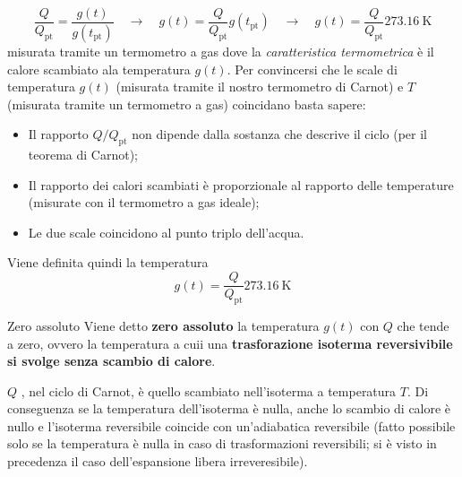 \documentclass[x11names]{report}
\begin{document}
\[ 
\frac{Q}{Q_{\text{pt}}} = \frac{g(t)}{g(t_{\text{pt}})} \quad \to \quad g(t) =\frac{Q}{Q_{\text{pt}}}  g(t_{\text{pt}}) \quad \to \quad g(t) =\frac{Q}{Q_{\text{pt}}}\SI{ 273.16}{\kelvin}
\]misurata tramite un termometro a gas
dove la \textit{caratteristica termometrica} è il calore scambiato ala temperatura \(g(t)\). Per convincersi che le scale di temperatura \(g(t)\) (misurata tramite il nostro termometro di Carnot) e \(T\) (misurata tramite un termometro a gas) coincidano basta sapere:
\begin{itemize}
	\item Il  rapporto \(Q/Q_{\text{pt}}\) non dipende dalla  sostanza che descrive il ciclo (per il teorema di Carnot);
	\item Il rapporto dei calori scambiati è proporzionale al rapporto delle temperature (misurate con il termometro a gas ideale);
	\item Le due scale coincidono al punto triplo dell'acqua.
\end{itemize}
Viene definita quindi la temperatura
\[ 
g(t) = \frac{Q}{Q_{\text{pt}}}\SI{ 273.16}{\kelvin}
\]
\begin{center}
	\colorbox{yblue}{\begin{minipage}{5.75in}
			\begin{blues}{Zero assoluto}
				Viene detto \textbf{zero assoluto} la temperatura \(g(t)\) con \(Q\) che tende a zero, ovvero la temperatura a cuii una \textbf{trasforazione isoterma reversivibile si svolge senza scambio di calore}.
			\end{blues}
	\end{minipage}}
\end{center}

\(Q\) , nel ciclo di Carnot, è quello scambiato nell'isoterma a temperatura \(T\). Di conseguenza se la temperatura dell'isoterma è nulla, anche lo scambio di calore è nullo e l'isoterma reversibile coincide con  un'adiabatica reversibile (fatto possibile solo se la temperatura è nulla in caso di trasformazioni reversibili; si è visto in precedenza il caso dell'espansione libera irreveresibile).

\newpage
\end{document}
